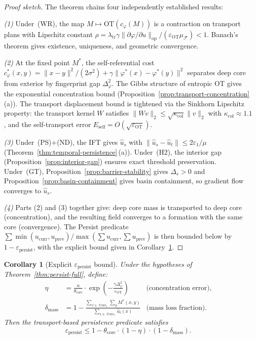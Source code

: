 \documentclass[lettersize,journal]{IEEEtran}
\newtheorem{corollary}[theorem]{Corollary}
\DeclareMathOperator{\Core}{Core}
\begin{document}
\begin{proof}[Proof sketch]
The theorem chains four independently established results:

\emph{(1)} Under~(WR), the map $M \mapsto \mathrm{OT}(c_\varphi(M))$ is a contraction on transport plans with Lipschitz constant $\rho = \lambda_{\mathrm{tr}} \gamma \|\partial\varphi/\partial u\|_{\mathrm{op}} / (\varepsilon_{\mathrm{OT}} \mu_{\mathcal{F}}) < 1$. Banach's theorem gives existence, uniqueness, and geometric convergence.

\emph{(2)} At the fixed point $M^*$, the self-referential cost $c_\varphi^*(x,y) = \|x - y\|^2/(2\sigma^2) + \gamma\|\varphi^*(x) - \varphi^*(y)\|^2$ separates deep core from exterior by fingerprint gap $\Delta_\varphi^2$. The Gibbs structure of entropic OT gives the exponential concentration bound (Proposition~\ref{prop:transport-concentration}\,(a)). The transport displacement bound is tightened via the Sinkhorn Lipschitz property: the transport kernel $W$ satisfies $\|Wv\|_2 \leq \sqrt{\kappa_{\mathrm{col}}} \|v\|_2$ with $\kappa_{\mathrm{col}} \approx 1.1$, and the self-transport error $E_{\mathrm{self}} = O(\sqrt{\varepsilon_{\mathrm{OT}}})$.

\emph{(3)} Under~(PS)+(ND), the IFT gives $\hat{u}_s$ with $\|\hat{u}_s - \hat{u}_t\| \leq 2\varepsilon_1/\mu$ (Theorem~\ref{thm:temporal-persistence}\,(a)). Under~(H2), the interior gap (Proposition~\ref{prop:interior-gap}) ensures exact threshold preservation. Under~(GT), Proposition~\ref{prop:barrier-stability} gives $\Delta_s > 0$ and Proposition~\ref{prop:basin-containment} gives basin containment, so gradient flow converges to $\hat{u}_s$.

\emph{(4)} Parts (2) and (3) together give: deep core mass is transported to deep core (concentration), and the resulting field converges to a formation with the same core (convergence). The Persist predicate $\sum \min(u_{\mathrm{curr}}, u_{\mathrm{prev}}) / \max(\sum u_{\mathrm{curr}}, \sum u_{\mathrm{prev}})$ is then bounded below by $1 - \varepsilon_{\mathrm{persist}}$, with the explicit bound given in Corollary~\ref{cor:persist-bound}.
\end{proof}

\begin{corollary}[Explicit $\varepsilon_{\mathrm{persist}}$ bound]
\label{cor:persist-bound}
Under the hypotheses of Theorem~\ref{thm:persist-full}, define:
\begin{align}
\eta &= \frac{n}{\theta_{\mathrm{core}}} \cdot \exp\!\left(-\frac{\gamma \Delta_\varphi^2}{\varepsilon_{\mathrm{OT}}}\right) &\text{(concentration error)}, \label{eq:eta-def}\\
\delta_{\mathrm{mass}} &= 1 - \frac{\sum_{x \in \Core_t} \sum_y M^*(x,y)}{\sum_{x \in \Core_t} \hat{u}_t(x)} &\text{(mass loss fraction)}. \label{eq:delta-mass-def}
\end{align}
Then the transport-based persistence predicate satisfies
\begin{equation}
\label{eq:persist-explicit}
\varepsilon_{\mathrm{persist}} \leq 1 - \theta_{\mathrm{core}} \cdot (1 - \eta) \cdot (1 - \delta_{\mathrm{mass}}).
\end{equation}
\end{corollary}
\end{document}
